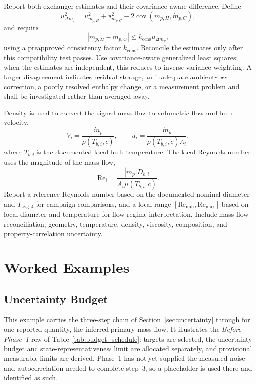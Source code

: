 \documentclass[11pt]{article}
\newcommand{\Tavg}{T_{\mathrm{avg},4}}
\newcommand{\mdotp}{\dot m_{p}}
\newcommand{\mdotpH}{\dot m_{p,H}}
\newcommand{\mdotpC}{\dot m_{p,C}}
\newcommand{\Rey}{\mathrm{Re}}
\begin{document}
Report both exchanger estimates and their covariance-aware difference. Define
\begin{equation}
    u_{\Delta\mdotp}^2
    =
    u_{\mdotpH}^2+u_{\mdotpC}^2
    -2\operatorname{cov}(\mdotpH,\mdotpC),
\end{equation}
and require
\begin{equation}
    |\mdotpH-\mdotpC|
    \leq
    k_{\mathrm{cons}}u_{\Delta\mdotp},
    \label{eq:flow_consistency}
\end{equation}
using a preapproved consistency factor $k_{\mathrm{cons}}$. Reconcile the estimates only after this compatibility test passes. Use covariance-aware generalized least squares; when the estimates are independent, this reduces to inverse-variance weighting. A larger disagreement indicates residual storage, an inadequate ambient-loss correction, a poorly resolved enthalpy change, or a measurement problem and shall be investigated rather than averaged away.

Density is used to convert the signed mass flow to volumetric flow and bulk velocity,
\begin{equation}
    \dot V_i=\frac{\mdotp}{\rho(T_{b,i},c)},
    \qquad
    u_i=\frac{\mdotp}{\rho(T_{b,i},c)A_i},
\end{equation}
where $T_{b,i}$ is the documented local bulk temperature. The local Reynolds number uses the magnitude of the mass flow,
\begin{equation}
    \Rey_i
    =
    \frac{|\mdotp|D_{h,i}}
    {A_i\mu(T_{b,i},c)}.
    \label{eq:re_local}
\end{equation}
Report a reference Reynolds number based on the documented nominal diameter and $\Tavg$ for campaign comparisons, and a local range $[\Rey_{\min},\Rey_{\max}]$ based on local diameter and temperature for flow-regime interpretation. Include mass-flow reconciliation, geometry, temperature, density, viscosity, composition, and property-correlation uncertainty.

\clearpage
\section{Worked Examples}
\subsection{Uncertainty Budget}
\label{sec:budget_example}

This example carries the three-step chain of Section~\ref{sec:uncertainty} through for one reported quantity, the inferred primary mass flow. It illustrates the \emph{Before Phase~1} row of Table~\ref{tab:budget_schedule}: targets are selected, the uncertainty budget and state-representativeness limit are allocated separately, and provisional measurable limits are derived. Phase~1 has not yet supplied the measured noise and autocorrelation needed to complete step~3, so a placeholder is used there and identified as such.
\end{document}
